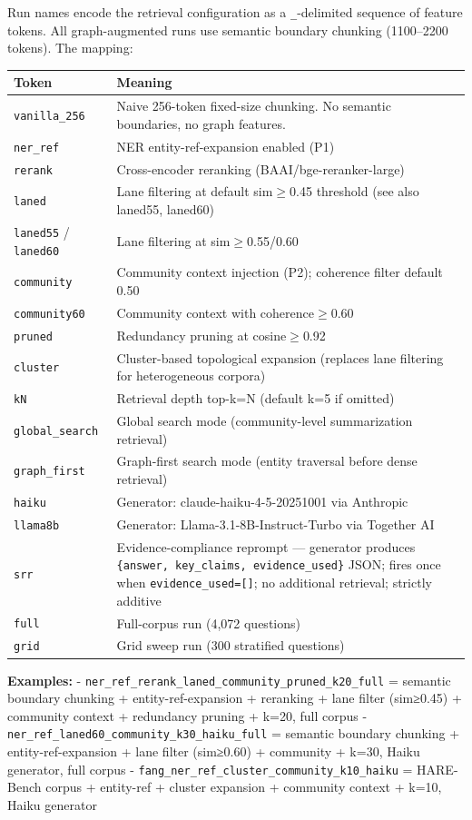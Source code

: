 \documentclass[
]{article}
\begin{document}
Run names encode the retrieval configuration as a \texttt{\_}-delimited
sequence of feature tokens. All graph-augmented runs use semantic
boundary chunking (1100--2200 tokens). The mapping:

\begin{small}
\setlength{\tabcolsep}{4pt}
\begin{longtable}{p{1.2in}p{5.0in}}
\toprule
\textbf{Token} & \textbf{Meaning} \\
\midrule
\endhead
\texttt{vanilla\_256} & Naive 256-token fixed-size chunking. No semantic boundaries, no graph features. \\
\texttt{ner\_ref} & NER entity-ref-expansion enabled (P1) \\
\texttt{rerank} & Cross-encoder reranking (BAAI/bge-reranker-large) \\
\texttt{laned} & Lane filtering at default sim$\geq$0.45 threshold (see also laned55, laned60) \\
\texttt{laned55} / \texttt{laned60} & Lane filtering at sim$\geq$0.55/0.60 \\
\texttt{community} & Community context injection (P2); coherence filter default 0.50 \\
\texttt{community60} & Community context with coherence$\geq$0.60 \\
\texttt{pruned} & Redundancy pruning at cosine$\geq$0.92 \\
\texttt{cluster} & Cluster-based topological expansion (replaces lane filtering for heterogeneous corpora) \\
\texttt{kN} & Retrieval depth top-k=N (default k=5 if omitted) \\
\texttt{global\_search} & Global search mode (community-level summarization retrieval) \\
\texttt{graph\_first} & Graph-first search mode (entity traversal before dense retrieval) \\
\texttt{haiku} & Generator: claude-haiku-4-5-20251001 via Anthropic \\
\texttt{llama8b} & Generator: Llama-3.1-8B-Instruct-Turbo via Together AI \\
\texttt{srr} & Evidence-compliance reprompt — generator produces \texttt{\{answer, key\_claims, evidence\_used\}} JSON; fires once when \texttt{evidence\_used=[]}; no additional retrieval; strictly additive \\
\texttt{full} & Full-corpus run (4,072 questions) \\
\texttt{grid} & Grid sweep run (300 stratified questions) \\
\bottomrule
\end{longtable}
\end{small}

\textbf{Examples:} -
\texttt{ner\_ref\_rerank\_laned\_community\_pruned\_k20\_full} =
semantic boundary chunking + entity-ref-expansion + reranking + lane
filter (sim≥0.45) + community context + redundancy pruning + k=20, full
corpus - \texttt{ner\_ref\_laned60\_community\_k30\_haiku\_full} =
semantic boundary chunking + entity-ref-expansion + lane filter
(sim≥0.60) + community + k=30, Haiku generator, full corpus -
\texttt{fang\_ner\_ref\_cluster\_community\_k10\_haiku} = HARE-Bench
corpus + entity-ref + cluster expansion + community context + k=10,
Haiku generator
\end{document}
